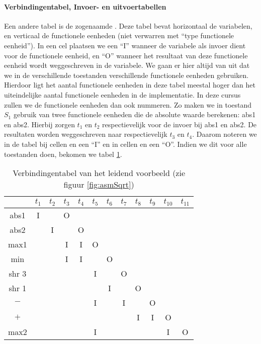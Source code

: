 \paragraph{Verbindingentabel, Invoer- en uitvoertabellen}
Een andere tabel is de zogenaamde . Deze tabel bevat horizontaal de variabelen, en verticaal de functionele eenheden (niet verwarren met ``type functionele eenheid''). In een cel plaatsen we een ``I'' wanneer de variabele als invoer dient voor de functionele eenheid, en ``O'' wanneer het resultaat van deze functionele eenheid wordt weggeschreven in de variabele. We gaan er hier altijd van uit dat we in de verschillende toestanden verschillende functionele eenheden gebruiken. Hierdoor ligt het aantal functionele eenheden in deze tabel meestal hoger dan het uiteindelijke aantal functionele eenheden in de implementatie. In deze cursus zullen we de functionele eenheden dan ook nummeren. Zo maken we in toestand $S_1$ gebruik van twee functionele eenheden die de absolute waarde berekenen: abs1 en abs2. Hierbij zorgen $t_1$ en $t_2$ respectievelijk voor de invoer bij abs1 en abs2. De resultaten worden weggeschreven naar respectievelijk $t_3$ en $t_4$. Daarom noteren we in de tabel bij
cellen  en  een ``I'' en in cellen  en  een ``O''. Indien we dit voor alle toestanden doen, bekomen we tabel \ref{tbl:connectiontableexample}.
\begin{table}[hbt]
\centering
\begin{tabular}{c|ccccccccccc}
	&$t_1$	&$t_2$	&$t_3$	&$t_4$	&$t_5$	&$t_6$	&$t_7$	&$t_8$	&$t_9$	&$t_{10}$	&$t_{11}$\\\hline
abs1	&I	&	&O	&	&	&	&	&	&	&		&\\
abs2	&	&I	&	&O	&	&	&	&	&	&		&\\
max1	&	&	&I	&I	&O	&	&	&	&	&		&\\
min	&	&	&I	&I	&	&O	&	&	&	&		&\\
shr 3	&	&	&	&	&I	&	&O	&	&	&		&\\
shr 1	&	&	&	&	&	&I	&	&O	&	&		&\\
$-$	&	&	&	&	&I	&	&I	&	&O	&		&\\
$+$	&	&	&	&	&	&	&	&I	&I	&O		&\\
max2	&	&	&	&	&I	&	&	&	&	&I		&O
\end{tabular}
\caption{Verbindingentabel van het leidend voorbeeld (zie figuur \ref{fig:asmSqrt})}
\label{tbl:connectiontableexample}
\end{table}
